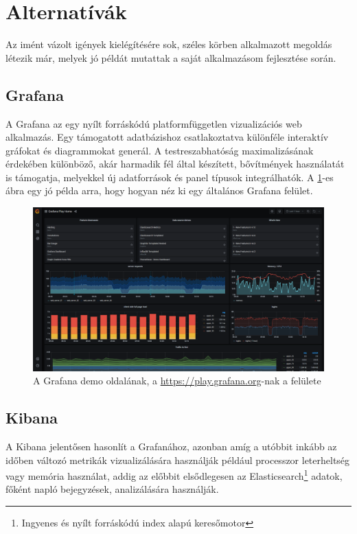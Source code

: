 \section{Alternatívák}
Az imént vázolt igények kielégítésére sok, széles körben alkalmazott megoldás létezik már, melyek jó példát mutattak a saját alkalmazásom fejlesztése során.

\subsection{Grafana}
A Grafana \cite{grafana} az egy nyílt forráskódú platformfüggetlen vizualizációs web alkalmazás.
Egy támogatott adatbázishoz csatlakoztatva különféle interaktív gráfokat és diagrammokat generál.
A testreszabhatóság maximalizásának érdekében különböző, akár harmadik fél által készített, bővítmények használatát is támogatja, 
melyekkel új adatforrások és panel típusok integrálhatók. 
A \ref{fig:grafana}-es ábra egy jó példa arra, hogy hogyan néz ki egy általános Grafana felület.

\begin{figure}[!ht]
    \centering
    \includegraphics[width=150mm, keepaspectratio]{figures/grafana.png}
    \caption{A Grafana demo oldalának, a \url{https://play.grafana.org}-nak a felülete}
    \label{fig:grafana}
\end{figure}
    
\subsection{Kibana}
A Kibana \cite{kibana} jelentősen hasonlít a Grafanához, azonban amíg a utóbbit inkább az időben változó metrikák vizualizálására használják például processzor leterheltség vagy memória használat,
addig az előbbit elsődlegesen az Elasticsearch\footnote{Ingyenes és nyílt forráskódú index alapú keresőmotor} adatok, főként napló bejegyzések, analizálására használják.

